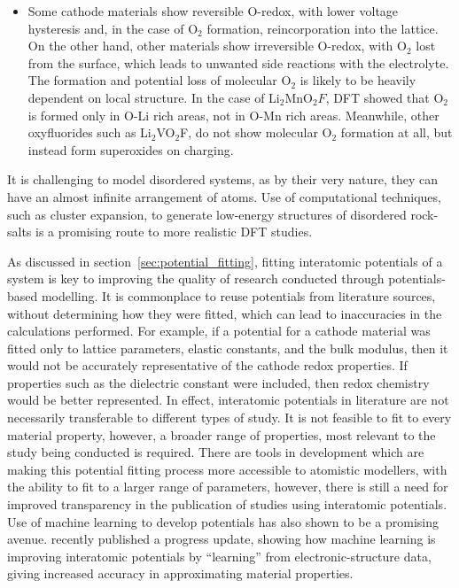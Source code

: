 \documentclass[../main.tex]{subfiles}
\begin{document}
\begin{itemize}
    \item Some cathode materials show reversible O-redox, with lower voltage hysteresis and, in the case of O$_2$ formation, reincorporation into the lattice.\cite{Sharpe2020} On the other hand, other materials show irreversible O-redox, with O$_2$ lost from the surface, \cite{Nakayama2020, Chen2016, House2020a} which leads to unwanted side reactions with the electrolyte. The formation and potential loss of molecular O$_2$ is likely to be heavily dependent on local structure. In the case of Li$_2$MnO$_2F$, DFT showed that O$_2$ is formed only in O-Li rich areas, not in O-Mn rich areas.\cite{Sharpe2020} Meanwhile, other oxyfluorides such as Li$_2$VO$_2$F, do not show molecular O$_2$ formation at all, but instead form superoxides on charging.\cite{Chang2020} 
\end{itemize}

It is challenging to model disordered systems, as by their very nature, they can have an almost infinite arrangement of atoms. Use of computational techniques, such as cluster expansion, to generate low-energy structures of disordered rock-salts is a promising route to more realistic DFT studies.\cite{Lun2020}

As discussed in section~\ref{sec:potential_fitting}, fitting interatomic potentials of a system is key to improving the quality of research conducted through potentials-based modelling. It is commonplace to reuse potentials from literature sources, without determining how they were fitted, which can lead to inaccuracies in the calculations performed. For example, if a potential for a cathode material was fitted only to lattice parameters, elastic constants, and the bulk modulus, then it would not be accurately representative of the cathode redox properties. If properties such as the dielectric constant were included, then redox chemistry would be better represented. In effect, interatomic potentials in literature are not necessarily transferable to different types of study. It is not feasible to fit to every material property, however, a broader range of properties, most relevant to the study being conducted is required. There are tools in development \cite{gale_empirical_1996, Stukowski_2017, wen_kim-compliant_2017, Morgan2020BuckFit} which are making this potential fitting process more accessible to atomistic modellers, with the ability to fit to a larger range of parameters, however, there is still a need for improved transparency in the publication of studies using interatomic potentials. Use of machine learning to develop potentials has also shown to be a promising avenue. \citeauthor{deringer2019machine} recently published a progress update, showing how machine learning is improving interatomic potentials by ``learning'' from electronic-structure data, giving increased accuracy in approximating material properties. \cite{deringer2019machine}
\end{document}
